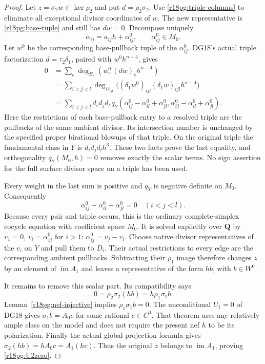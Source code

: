 \begin{proof}
Let $z=\sigma_2w\in\ker\rho_2$ and put $d=\rho_2\sigma_2$.
Use \eqref{r18pg:triple-columns} to eliminate all exceptional
divisor coordinates of $w$.  The new representative is
\eqref{r18pg:base-tuple} and still has $dw=0$.
Decompose uniquely
\[
             \alpha_{ij}=a_{ij}h+\alpha^0_{ij},
                               \qquad\alpha^0_{ij}\in M_0.
 \tag{PG18.15}\label{r18pg:alpha-decomposition}
\]
Let $w^0$ be the corresponding base-pullback tuple of the
$\alpha^0_{ij}$.  DG18's actual triple factorization
$d=\tau_2\delta_1$, paired with $w^0h^{n-4}$, gives
\[
 \begin{aligned}
 0&=\sum_e\deg_{E_e}(w^0_e\,(dw)_e h^{n-4})\\
  &=\sum_{i<j<l}\deg_{D_{ijl}}
                \bigl((\delta_1w^0)_{ijl}(\delta_1w)_{ijl}h^{n-4}\bigr)\\
  &=\sum_{i<j<l}d_id_jd_l\,
              q_Y(\alpha^0_{ij}-\alpha^0_{il}+\alpha^0_{jl},
                   \alpha^0_{ij}-\alpha^0_{il}+\alpha^0_{jl}).
 \end{aligned}
 \tag{PG18.16}\label{r18pg:primitive-energy}
\]
Here the restrictions of each base-pullback entry to a resolved
triple are the pullbacks of the same ambient divisor.  Its
intersection number is unchanged by the specified proper birational
blowups of that triple.  On the original triple the fundamental
class in $Y$ is $d_id_jd_lh^3$.  These two facts prove the last
equality, and orthogonality $q_Y(M_0,h)=0$ removes exactly the
scalar terms.  No sign assertion for the full surface divisor
space on a triple has been used.

Every weight in the last sum is positive and $q_Y$ is negative
definite on $M_0$.  Consequently
\[
                      \alpha^0_{ij}-\alpha^0_{il}+\alpha^0_{jl}=0
                                \quad(i<j<l).
 \tag{PG18.17}\label{r18pg:cocycle}
\]
Because every pair and triple occurs, this is the ordinary
complete-simplex cocycle equation with coefficient space $M_0$.
It is solved explicitly over $\mathbf Q$ by
$v_1=0$, $v_i=\alpha^0_{1i}$ for $i>1$:
$\alpha^0_{ij}=v_j-v_i$.  Choose native divisor representatives
of the $v_i$ on $Y$ and pull them to $D_i$.  Their actual
restrictions to every edge are the corresponding ambient
pullbacks.  Subtracting their $\rho_1$ image therefore changes
$z$ by an element of $\operatorname{im}A_1$ and leaves a
representative of the form $hb$, with $b\in W^0$.

It remains to remove this scalar part.  Its compatibility says
\[
                   0=\rho_2\sigma_2(hb)=h\rho_1\sigma_1b.
 \tag{PG18.18}\label{r18pg:scalar-step}
\]
Lemma~\ref{r18pg:nef-injective} implies
$\rho_1\sigma_1b=0$.  The unconditional $U_1=0$ of DG18 gives
$\sigma_1b=A_0c$ for some rational $c\in C^0$.  That theorem
uses any relatively ample class on the model and does not require
the present nef $h$ to be its polarization.  Finally the actual
global projection formula gives
$\sigma_2(hb)=hA_0c=A_1(hc)$.
Thus the original $z$ belongs to $\operatorname{im}A_1$, proving
\eqref{r18pg:U2zero}.
\end{proof}

